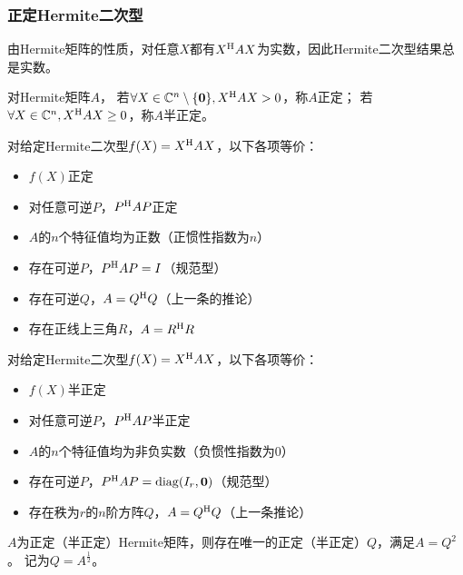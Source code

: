 \subsubsection{正定Hermite二次型}

由Hermite矩阵的性质，对任意$X$都有$X^\mathrm{H} AX$为实数，因此Hermite二次型结果总是实数。

\begin{definition}[正定~半正定]
    对Hermite矩阵$A$，
    若$\forall X\in \mathbb{C}^{n}\setminus\{\bm{0}\},X^\mathrm{H} AX>0$，称$A$正定；
    若$\forall X\in \mathbb{C}^{n}, X^\mathrm{H} AX \geq 0$，称$A$半正定。
\end{definition}

\begin{theorem}
    对给定Hermite二次型$f(X)=X^\mathrm{H} AX$，以下各项等价：
    \begin{itemize}
        \item $f(X)$正定
        \item 对任意可逆$P$，$P^\mathrm{H} AP$正定
        \item $A$的$n$个特征值均为正数（正惯性指数为$n$）
        \item 存在可逆$P$，$P^\mathrm{H} AP=I$（规范型）
        \item 存在可逆$Q$，$A=Q^\mathrm{H} Q$（上一条的推论）
        \item 存在正线上三角$R$，$A=R^\mathrm{H} R$
    \end{itemize}
\end{theorem}

\begin{theorem}
    对给定Hermite二次型$f(X)=X^\mathrm{H} AX$，以下各项等价：
    \begin{itemize}
        \item $f(X)$半正定
        \item 对任意可逆$P$，$P^\mathrm{H} AP$半正定
        \item $A$的$n$个特征值均为非负实数（负惯性指数为$0$）
        \item 存在可逆$P$，$P^\mathrm{H} AP=\operatorname{diag}(I_r, \bm{0})$（规范型）
        \item 存在秩为$r$的$n$阶方阵$Q$，$A=Q^\mathrm{H} Q$（上一条推论）
    \end{itemize}
\end{theorem}

\begin{theorem}
    $A$为正定（半正定）Hermite矩阵，则存在唯一的正定（半正定）$Q$，满足$A=Q^2$。
    记为$Q=A^{\frac{1}{2}}$。
\end{theorem}

